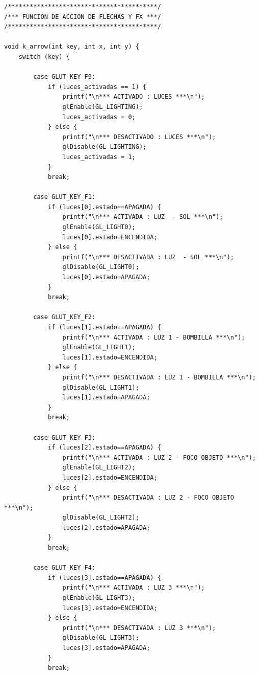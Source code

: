\documentclass[12pt,a4paper]{article}
\begin{document}
\begin{lstlisting}
/*****************************************/
/*** FUNCION DE ACCION DE FLECHAS Y FX ***/
/*****************************************/

void k_arrow(int key, int x, int y) {
    switch (key) {
    
        case GLUT_KEY_F9:
            if (luces_activadas == 1) {
                printf("\n*** ACTIVADO : LUCES ***\n");
                glEnable(GL_LIGHTING);
                luces_activadas = 0;
            } else {
                printf("\n*** DESACTIVADO : LUCES ***\n");
                glDisable(GL_LIGHTING);
                luces_activadas = 1;
            }
            break;
            
        case GLUT_KEY_F1:
            if (luces[0].estado==APAGADA) {
                printf("\n*** ACTIVADA : LUZ  - SOL ***\n");
                glEnable(GL_LIGHT0);
                luces[0].estado=ENCENDIDA;
            } else {
                printf("\n*** DESACTIVADA : LUZ  - SOL ***\n");
                glDisable(GL_LIGHT0);
                luces[0].estado=APAGADA;
            }
            break;
            
        case GLUT_KEY_F2:
            if (luces[1].estado==APAGADA) {
                printf("\n*** ACTIVADA : LUZ 1 - BOMBILLA ***\n");
                glEnable(GL_LIGHT1);
                luces[1].estado=ENCENDIDA;
            } else {
                printf("\n*** DESACTIVADA : LUZ 1 - BOMBILLA ***\n");
                glDisable(GL_LIGHT1);
                luces[1].estado=APAGADA;
            }
            break;
            
        case GLUT_KEY_F3:
            if (luces[2].estado==APAGADA) {
                printf("\n*** ACTIVADA : LUZ 2 - FOCO OBJETO ***\n");
                glEnable(GL_LIGHT2);
                luces[2].estado=ENCENDIDA;
            } else {
                printf("\n*** DESACTIVADA : LUZ 2 - FOCO OBJETO ***\n");
                glDisable(GL_LIGHT2);
                luces[2].estado=APAGADA;
            }
            break;
            
        case GLUT_KEY_F4:
            if (luces[3].estado==APAGADA) {
                printf("\n*** ACTIVADA : LUZ 3 ***\n");
                glEnable(GL_LIGHT3);
                luces[3].estado=ENCENDIDA;
            } else {
                printf("\n*** DESACTIVADA : LUZ 3 ***\n");
                glDisable(GL_LIGHT3);
                luces[3].estado=APAGADA;
            }
            break;
            

\end{lstlisting}
\end{document}
